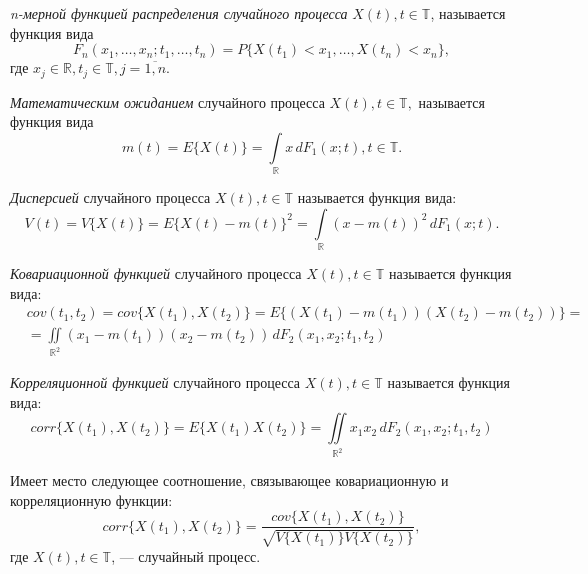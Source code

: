 \begin{Definition}
\label{def:distr_func}
	\textit{n-мерной функцией распределения случайного процесса} $ X(t), t \in \mathbb{T} $, называется функция вида
	\begin{equation*}
		F_n(x_1, \dots, x_n; t_1, \dots, t_n) = P \{ X(t_1) < x_1, \dots, X(t_n) < x_n \},
	\end{equation*}
	где $ x_j \in \mathbb{R}, t_j \in \mathbb{T}, j = \overline{1,n} $.
\end{Definition}

\begin{Definition}
	\textit{Математическим ожиданием} случайного процесса $ X(t), t \in \mathbb{T}, $ называется функция вида
	\begin{equation*}
		m(t) = E \{ X(t) \} = \int \limits_{\mathbb{R}} x \, dF_1(x;t), t \in \mathbb{T}.
	\end{equation*}
\end{Definition}

\begin{Definition}
	\textit{Дисперсией} случайного процесса $ X(t), t \in \mathbb{T} $ называется функция вида:
	\begin{equation*}
		V(t) = V \{ X(t) \} = E \{ X(t) - m(t) \}^2 = \int \limits_{\mathbb{R}} (x - m(t))^2 \, dF_1(x; t).
	\end{equation*}
\end{Definition}

\begin{Definition}
	\textit{Ковариационной функцией} случайного процесса $ X(t), t \in \mathbb{T} $ называется функция вида:
	\begin{eqnarray*}
		& cov(t_1, t_2) = cov\{ X(t_1), X(t_2) \} = E \{ (X(t_1) - m(t_1)) (X(t_2) - m(t_2)) \} = \\
		& = \iint \limits_{\mathbb{R}^2} (x_1 - m(t_1)) (x_2 - m(t_2)) \, dF_2(x_1, x_2; t_1, t_2)
	\end{eqnarray*}
\end{Definition}

\begin{Definition}
	\textit{Корреляционной функцией} случайного процесса $ X(t), t \in \mathbb{T} $ называется функция вида:
	\begin{equation*}
		corr\{ X(t_1), X(t_2) \} = E \{ X(t_1)X(t_2) \} = \iint \limits_{\mathbb{R}^2} x_1 x_2 \, dF_2(x_1, x_2; t_1, t_2)
	\end{equation*}
\end{Definition}

\begin{Remark}
\label{rem:corr_cov}
	Имеет место следующее соотношение, связывающее ковариационную и корреляционную функции:
	\begin{equation*}
		corr\{ X(t_1), X(t_2)\} = \frac{cov\{ X(t_1), X(t_2) \}}{\sqrt{ V\{ X(t_1) \} V\{ X(t_2) \} }},
	\end{equation*}
	где $ X(t), t \in \mathbb{T} $, --- случайный процесс.
\end{Remark}

